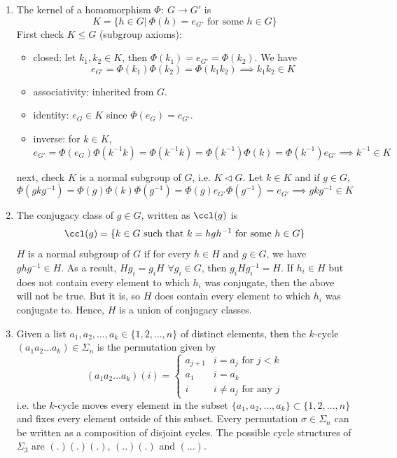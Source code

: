 \documentclass[a4paper]{article}
\begin{document}
\begin{ans}\leavevmode
\begin{enumerate}[label=(\alph*)]
\item The kernel of a homomorphism $\Phi:~G\rightarrow G'$ is
$$K=\{h\in G|~\Phi(h)=e_{G'}\text{ for some }h\in G\}$$
First check $K\leq G$ (subgroup axioms):
\begin{itemize}
    \item closed: let $k_1,k_2\in K$, then $\Phi(k_1)=e_{G'}=\Phi(k_2)$. We have
    $$e_{G'}=\Phi(k_1)\Phi(k_2)=\Phi(k_1k_2)\implies k_1k_2\in K$$
    \item associativity: inherited from $G$.
    \item identity: $e_G\in K$ since $\Phi(e_G)=e_{G'}$.
    \item inverse: for $k\in K$,
    $$e_{G'}=\Phi(e_G)\Phi(k^{-1}k)=\Phi(k^{-1}k)=\Phi(k^{-1})\Phi(k)=\Phi(k^{-1})e_{G'}\implies k^{-1}\in K$$
\end{itemize}
next, check $K$ is a normal subgroup of $G$, i.e. $K\lhd G$. Let $k\in K$ and if $g\in G$,
$$\Phi(gkg^{-1})=\Phi(g)\Phi(k)\Phi(g^{-1})=\Phi(g)e_{G'}\Phi(g^{-1})=e_{G'}\implies gkg^{-1}\in K$$
\item The conjugacy class of $g\in G$, written as $\ccl(g)$ is
$$\ccl(g)=\{k\in G\text{ such that }k=hgh^{-1}\text{ for some }h\in G\}$$
$H$ is a normal subgroup of $G$ if for every $h\in H$ and $g\in G$, we have $ghg^{-1}\in H$. As a result, $Hg_i=g_iH$ $\forall g_i\in G$, then $g_iHg_i^{-1}=H$. If $h_i\in H$ but does not contain every element to which $h_i$ was conjugate, then the above will not be true. But it is, so $H$ does contain every element to which $h_i$ was conjugate to. Hence, $H$ is a union of conjugacy classes.
\newpage
\item Given a list $a_1,a_2,\dots,a_k\in\{1,2,\dots,n\}$ of distinct elements, then the $k$-cycle $(a_1a_2\dots a_k)\in \Sigma_n$ is the permutation given by
$$(a_1a_2\dots a_k)(i)=
\left\{
        \begin{array}{ll}
      a_{j+1} & i=a_j\text{ for }j<k \\
      a_1 & i=a_k\\
      i & i\neq a_j\text{ for any }j
        \end{array}
    \right.$$
i.e. the $k$-cycle moves every element in the subset $\{a_1,a_2,\dots,a_k\}\subset\{1,2,\dots,n\}$ and fixes every element outside of this subset. Every permutation $\sigma\in\Sigma_n$ can be written as a composition of disjoint cycles. The possible cycle structures of $\Sigma_3$ are $(.)(.)(.)$, $(..)(.)$ and $(...)$.

\end{enumerate}
\end{ans}
\end{document}
